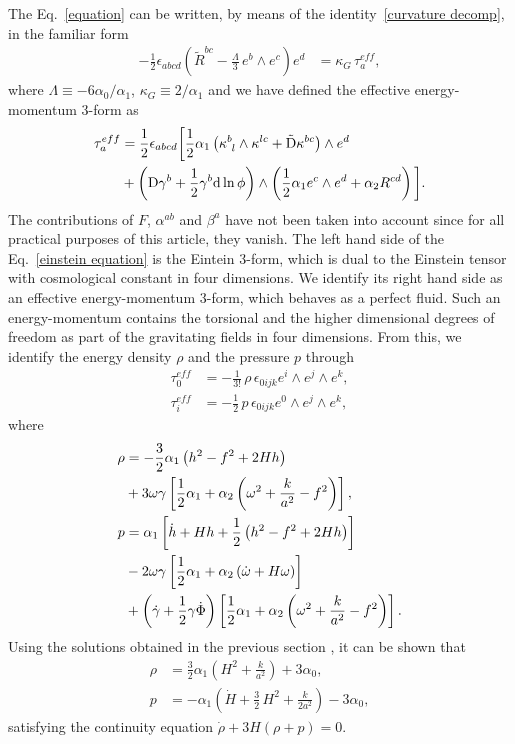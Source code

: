 \documentclass[aps,prd,12pt,superscriptaddress,showpacs,showkeys,longbibliography,reprint,nofootinbib]{revtex4-1}
\begin{document}
The Eq.~\eqref{equation} can be written, by means of the identity~\eqref{curvature decomp}, in the familiar form
\begin{align}\label{einstein equation}
  -\frac{1}{2}\epsilon_{abcd}\left(\tilde{R}^{bc} - \frac{\Lambda}{3}\,e^b\wedge e^c\right)e^d &= \kappa_{G}\,\tau^{eff}_a,
\end{align}
where $\Lambda \equiv -6\alpha_0/\alpha_1$, $\kappa_{G} \equiv 2/\alpha_1$ and we have defined the effective energy-momentum $3$-form as
\begin{align}
  \tau_a^{eff}&= \frac{1}{2}\epsilon_{abcd}\bigg[\frac{1}{2}\alpha_1\left(\kappa^b_{\ l}\wedge\kappa^{lc}+\tilde{\text{D}}\kappa^{bc}\right)\wedge e^d\notag\\
    &+\left(\text{D}\gamma^b+\frac{1}{2}\gamma^b\text{d}\ln\phi\right)\wedge\left(\frac{1}{2}\alpha_1e^c\wedge e^d+\alpha_2R^{cd}\right)\bigg].
\end{align}
The contributions of $F$, $\alpha^{ab}$ and $\beta^a$ have not been taken into account since for all practical purposes of this article, they vanish. The left hand side of the Eq.~\eqref{einstein equation} is the Eintein $3$-form, which is dual to the Einstein tensor with cosmological constant in four dimensions. We identify its right hand side as an effective energy-momentum $3$-form, which behaves as a perfect fluid. Such an energy-momentum contains the torsional and the higher dimensional degrees of freedom as part of the gravitating fields in four dimensions. From this, we identify the energy density $\rho$ and the pressure $p$ through
\begin{align}
  \tau_0^{eff}&=-\frac{1}{3!}\,\rho\,\epsilon_{0ijk}e^i\wedge e^j\wedge e^k,\\
  \tau_i^{eff}&=-\frac{1}{2}\,p\,\epsilon_{0ijk}e^0\wedge e^j\wedge e^k,
\end{align} 
where
\begin{align}\label{rho}
  \rho&=-\frac{3}{2}\alpha_1\left(h^2-f^2+2Hh\right)\notag\\
  &+3\omega\gamma\left[\frac{1}{2}\alpha_1+\alpha_2\left(\omega^2+\frac{k}{a^2}-f^2\right)\right],\\
  \label{presion}
  p&=\alpha_1\left[\dot{h}+Hh+\frac{1}{2}\left(h^2-f^2+2Hh\right)\right]\notag\\
  &-2\omega\gamma\left[\frac{1}{2}\alpha_1+\alpha_2\left(\dot{\omega}+H\omega\right)\right]\notag\\
  &+\left(\dot{\gamma}+\frac{1}{2}\gamma\dot{\Phi}\right)\left[\frac{1}{2}\alpha_1+\alpha_2\left(\omega^2+\frac{k}{a^2}-f^2\right)\right].
\end{align}
Using the solutions obtained in the previous section , it can be shown that
\begin{align}
  \rho &= \frac{3}{2}\alpha_1\left(H^2 + \frac{k}{a^2}\right) + 3\alpha_0, \\
  p &= -\alpha_1\left(\dot{H} + \frac{3}{2}\,H^2 + \frac{k}{2a^2}\right) - 3\alpha_0,
\end{align}
satisfying the continuity equation $\dot{\rho}+3H\left(\rho+p\right)=0$. 
\end{document}
